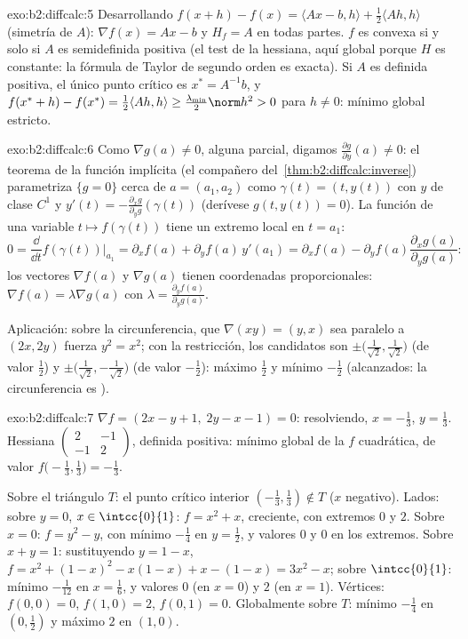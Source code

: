 \begin{solution}{exo:b2:diffcalc:5}
Desarrollando $f(x + h) - f(x) = \langle Ax - b, h\rangle +
\frac12\langle Ah, h\rangle$ (simetría de $A$): $\nabla f(x) = Ax -
b$ y $H_f = A$ en todas partes. $f$ es convexa si y solo si $A$ es
semidefinida positiva (el test de la hessiana, aquí global porque $H$
es constante: la fórmula de Taylor de segundo orden es exacta). Si
$A$ es definida positiva, el único punto crítico es $x^* = A^{-1}b$,
y $f(x^* + h) - f(x^*) = \frac12\langle Ah, h\rangle \geq
\frac{\lambda_{\min}}{2}\norm h^2 > 0$ para $h \neq 0$: mínimo global
estricto.
\end{solution}

\begin{solution}{exo:b2:diffcalc:6}
Como $\nabla g(a) \neq 0$, alguna parcial, digamos $\frac{\partial
g}{\partial y}(a) \neq 0$: el teorema de la función implícita (el
compañero del~\cref{thm:b2:diffcalc:inverse}) parametriza $\{g = 0\}$
cerca de $a = (a_1, a_2)$ como $\gamma(t) = (t, y(t))$ con $y$ de
clase $C^1$ y $y'(t) = -\frac{\partial_x g}{\partial_y
g}(\gamma(t))$ (derívese $g(t, y(t)) = 0$). La función de una
variable $t \mapsto f(\gamma(t))$ tiene un extremo local en $t =
a_1$:
\[
0 = \frac{\dd}{\dd t}f(\gamma(t))\Big|_{a_1}
= \partial_x f(a) + \partial_y f(a)\,y'(a_1)
= \partial_x f(a) - \partial_yf(a)\frac{\partial_x
g(a)}{\partial_y g(a)} :
\]
los vectores $\nabla f(a)$ y $\nabla g(a)$ tienen coordenadas
proporcionales: $\nabla f(a) = \lambda \nabla g(a)$ con $\lambda =
\frac{\partial_y f(a)}{\partial_y g(a)}$.

Aplicación: sobre la circunferencia, que $\nabla(xy) = (y, x)$ sea
paralelo a $(2x, 2y)$ fuerza $y^2 = x^2$; con la restricción, los
candidatos son $\pm\bigl(\tfrac{1}{\sqrt2},
\tfrac{1}{\sqrt2}\bigr)$ (de valor $\frac12$) y
$\pm\bigl(\tfrac{1}{\sqrt2}, -\tfrac{1}{\sqrt2}\bigr)$ (de valor
$-\frac12$): máximo $\frac12$ y mínimo $-\frac12$ (alcanzados: la
circunferencia es ).
\end{solution}

\begin{solution}{exo:b2:diffcalc:7}
$\nabla f = (2x - y + 1,\; 2y - x - 1) = 0$: resolviendo, $x =
-\frac13$, $y = \frac13$. Hessiana $\begin{pmatrix} 2 & -1\\ -1 &
2\end{pmatrix}$, definida positiva: mínimo global de la $f$
cuadrática, de valor $f\bigl(-\frac13, \frac13\bigr) = -\frac13$.

Sobre el triángulo $T$: el punto crítico interior $(-\frac13,
\frac13) \notin T$ ($x$ negativo). Lados: sobre $y = 0$, $x \in
\intcc{0}{1}$: $f = x^2 + x$, creciente, con extremos $0$ y $2$.
Sobre $x = 0$: $f = y^2 - y$, con mínimo $-\frac14$ en $y =
\frac12$, y valores $0$ y $0$ en los extremos. Sobre $x + y = 1$:
sustituyendo $y = 1 - x$, $f = x^2 + (1-x)^2 - x(1-x) + x - (1-x) =
3x^2 - x$; sobre $\intcc{0}{1}$: mínimo $-\frac{1}{12}$ en $x =
\frac16$, y valores $0$ (en $x=0$) y $2$ (en $x=1$). Vértices:
$f(0,0) = 0$, $f(1,0) = 2$, $f(0,1) = 0$. Globalmente sobre $T$:
mínimo $-\frac14$ en $(0, \frac12)$ y máximo $2$ en $(1, 0)$.
\end{solution}

